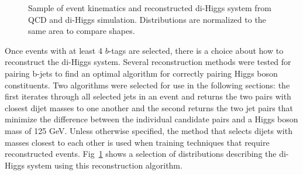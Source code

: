 \begin{figure}[ht!]
\begin{center}
  \caption{Sample of event kinematics and reconstructed di-Higgs system from QCD and di-Higgs simulation. Distributions are normalized to the same area to compare shapes.}
  \label{fig:jetInfo}
  \end{center}
\end{figure}

Once events with at least 4 $b$-tags are selected, there is a choice about how to reconstruct the di-Higgs system. Several reconstruction methods were tested for pairing b-jets to find an optimal algorithm for correctly pairing Higgs boson constituents. Two algorithms were selected for use in the following sections: the first iterates through all selected jets in an event and returns the two pairs with closest dijet masses to one another and the second returns the two jet pairs that minimize the difference between the individual candidate pairs and a Higgs boson mass of 125 GeV. Unless otherwise specified, the method that selects dijets with masses closest to each other is used when training techniques that require reconstructed events. Fig~\ref{fig:jetInfo} shows a selection of distributions describing the di-Higgs system using this reconstruction algorithm.%


